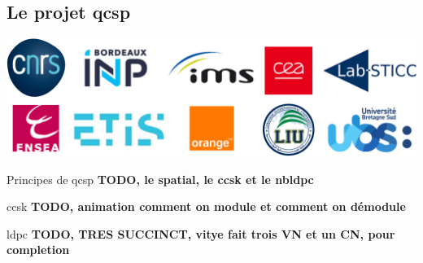 \documentclass[../main.tex]{subfiles}
\begin{document}
\subsection{Le projet \acrfull{qcsp}}

\begin{frame}{\subsecname}
  \begin{center}
    \includegraphics[width=0.6\linewidth]{figures/logos-thesis/partners-logos.png}
  \end{center}
\end{frame}

\begin{frame}{Principes de \acrshort{qcsp}}
  \textbf{TODO, le spatial, le ccsk et le nbldpc}
\end{frame}

\begin{frame}{\acrfull{ccsk}}
  \textbf{TODO, animation comment on module et comment on démodule}
\end{frame}

\begin{frame}{\acrfull{ldpc}}
  \textbf{TODO, TRES SUCCINCT, vitye fait trois VN et un CN, pour completion}
\end{frame}
\end{document}
